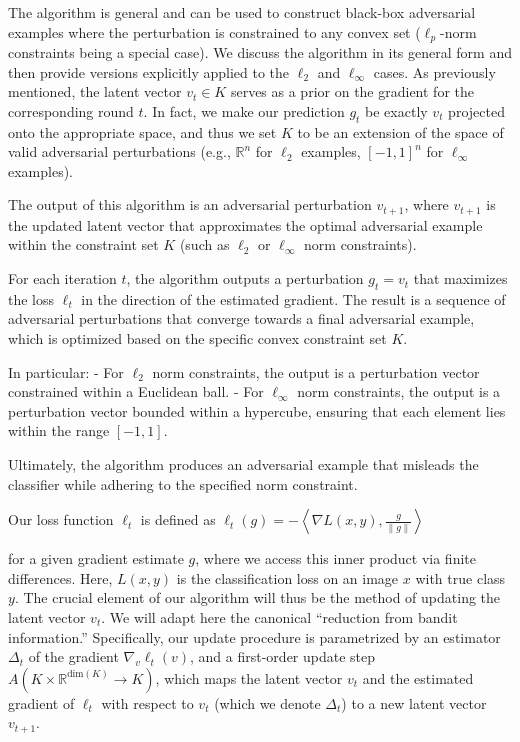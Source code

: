 
The algorithm is general and can be used to construct black-box adversarial examples where the perturbation is constrained to any convex set ($\ell_p$-norm constraints being a special case). We discuss the algorithm in its general form and then provide versions explicitly applied to the $\ell_2$ and $\ell_\infty$ cases. As previously mentioned, the latent vector $v_t \in K$ serves as a prior on the gradient for the corresponding round $t$. In fact, we make our prediction $g_t$ be exactly $v_t$ projected onto the appropriate space, and thus we set $K$ to be an extension of the space of valid adversarial perturbations (e.g., $\mathbb{R}^n$ for $\ell_2$ examples, $[-1, 1]^n$ for $\ell_\infty$ examples).

The output of this algorithm is an adversarial perturbation $v_{t+1}$, where $v_{t+1}$ is the updated latent vector that approximates the optimal adversarial example within the constraint set $K$ (such as $\ell_2$ or $\ell_\infty$ norm constraints). 

For each iteration $t$, the algorithm outputs a perturbation $g_t = v_t$ that maximizes the loss $\ell_t$ in the direction of the estimated gradient. The result is a sequence of adversarial perturbations that converge towards a final adversarial example, which is optimized based on the specific convex constraint set $K$.

In particular:
- For $\ell_2$ norm constraints, the output is a perturbation vector constrained within a Euclidean ball.
- For $\ell_\infty$ norm constraints, the output is a perturbation vector bounded within a hypercube, ensuring that each element lies within the range $[-1, 1]$.

Ultimately, the algorithm produces an adversarial example that misleads the classifier while adhering to the specified norm constraint.

Our loss function $\ell_t$ is defined as
$\ell_t(g) = -\left\langle \nabla L(x, y), \frac{g}{\|g\|} \right\rangle$

for a given gradient estimate $g$, where we access this inner product via finite differences. Here, $L(x, y)$ is the classification loss on an image $x$ with true class $y$. The crucial element of our algorithm will thus be the method of updating the latent vector $v_t$. We will adapt here the canonical “reduction from bandit information.” Specifically, our update procedure is parametrized by an estimator $\Delta_t$ of the gradient $\nabla_v \ell_t(v)$, and a first-order update step $A (K \times \mathbb{R}^{\text{dim}(K)} \to K)$, which maps the latent vector $v_t$ and the estimated gradient of $\ell_t$ with respect to $v_t$ (which we denote $\Delta_t$) to a new latent vector $v_{t+1}$.

